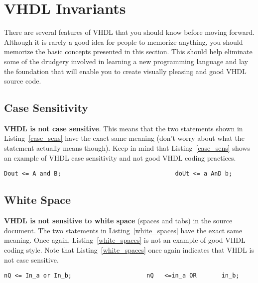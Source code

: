 %
%
\chapter{VHDL Invariants}
There are several features of VHDL that you should know before moving forward. Although it is rarely a good idea for people to memorize anything, you should memorize the basic concepts presented in this section. This should help eliminate some of the drudgery involved in learning a new programming language and lay the foundation that will enable you to create visually pleasing and good VHDL source code.

\section{Case Sensitivity}
\textbf{VHDL is not case sensitive}. This means that the two statements shown in Listing~\ref{case_sens} have the exact same meaning (don't worry about what the statement actually means though). Keep in mind that Listing~\ref{case_sens} shows an example of VHDL case sensitivity and not good VHDL coding practices.

\noindent
\begin{minipage}{0.99\linewidth}
\begin{lstlisting}[label=case_sens, caption=An example of VHDL case insensitivity.]
Dout <= A and B;								doUt <= a AnD b;
\end{lstlisting}
\end{minipage}

\section{White Space}
\textbf{VHDL is not sensitive to white space} (spaces and tabs) in the source document. The two statements in Listing~\ref{white_spaces} have the exact same meaning. Once again, Listing~\ref{white_spaces} is not an example of good VHDL coding style. Note that Listing~\ref{white_spaces} once again indicates that VHDL is not case sensitive.

\noindent
\begin{minipage}{0.99\linewidth}
\begin{lstlisting}[label=white_spaces, caption=An example showing VHDL's indifference to white space.]
nQ <= In_a or In_b;						nQ   <=in_a OR       in_b;
\end{lstlisting}
\end{minipage}

